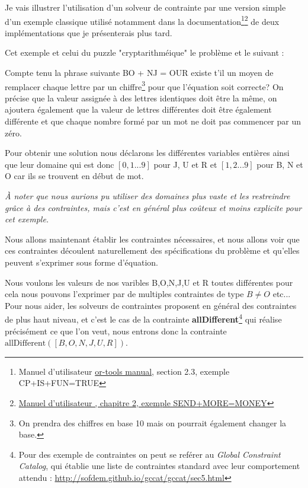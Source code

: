 
Je vais illustrer l'utilisation d'un solveur de contrainte par une version simple d'un exemple classique utilisé notamment dans la documentation\footnote{Manuel d'utilisateur \ortools{} \href{https://drive.google.com/file/d/0B7kalaGEbfufQ0h0N3J4TkVVaDQ/view?usp=sharing}{or-tools manual}, section 2.3, exemple CP+IS+FUN=TRUE}\footnote{\href{http://www.gecode.org/doc-latest/MPG.pdf}{Manuel d'utilisateur \gecode{}, chapitre 2, exemple SEND+MORE=MONEY}} de deux implémentations que je présenterais plus tard.

Cet exemple et celui du puzzle "cryptarithméique" le problème et le suivant :

Compte tenu la phrase suivante BO + NJ = OUR existe t'il un moyen de remplacer chaque lettre par un chiffre\footnote{On prendra des chiffres en base 10 mais on pourrait également changer la base.} pour que l'équation soit correcte? On précise que la valeur assignée à des lettres identiques doit être la même, on ajoutera également que la valeur de lettres différentes doit être également différente et que chaque nombre formé par un mot ne doit pas commencer par un zéro.

Pour obtenir une solution nous déclarons les différentes variables entières ainsi que leur domaine qui est donc $[0,1...9]$ pour J, U et R et $[1,2...9]$ pour B, N et O car ils se trouvent en début de mot.

\emph{À noter que nous aurions pu utiliser des domaines plus vaste et les restreindre grâce à des contraintes, mais c'est en général plus coûteux et moins explicite pour cet exemple.}

Nous allons maintenant établir les contraintes nécessaires, et nous allons voir que ces contraintes découlent naturellement des spécifications du problème et qu'elles peuvent s'exprimer sous forme d'équation.

Nous voulons les valeurs de nos varibles B,O,N,J,U et R toutes différentes pour cela nous pouvons l'exprimer par de multiples contraintes de type $B \neq O$ etc... Pour nous aider, les solveurs de contraintes proposent en général des contraintes de plus haut niveau, et c'est le cas de la contrainte \textbf{allDifferent}\footnote{Pour des exemple de contraintes on peut se reférer au \emph{Global Constraint Catalog}, qui établie une liste de contraintes standard avec leur comportement attendu : \url{http://sofdem.github.io/gccat/gccat/sec5.html}} qui réalise précisément ce que l'on veut, nous entrons donc la contrainte $\mathrm{allDifferent}([B,O,N,J,U,R])$.

